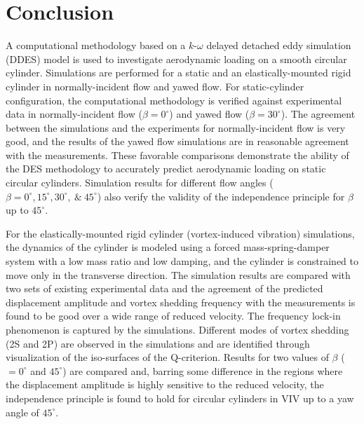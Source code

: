 \documentclass[12pt,authoryear]{elsarticle}
\begin{document}




%



\section{Conclusion}
\label{sec:conclusions}
%
A computational methodology based on a $k$-$\omega$ delayed detached eddy
simulation (DDES) model is used to investigate aerodynamic loading on a smooth
circular cylinder. Simulations are performed for a static and an
elastically-mounted rigid cylinder in normally-incident flow and yawed flow.
For static-cylinder configuration, the computational methodology is verified
against experimental data in normally-incident flow ($\beta=0^\circ$) and yawed
flow ($\beta=30^\circ$). The agreement between the simulations and the
experiments for normally-incident flow is very good, and the results of the
yawed flow simulations are in reasonable agreement with the measurements.
These favorable comparisons demonstrate the ability of the DES methodology to
accurately predict aerodynamic loading on static circular cylinders. Simulation
results for different flow angles ($\beta =0^\circ, 15^\circ,
30^\circ,~\&~45^\circ$) also verify the validity of the independence principle
for $\beta$ up to $45^\circ$.

For the elastically-mounted rigid cylinder (vortex-induced vibration)
simulations, the dynamics of the cylinder is modeled using a forced
mass-spring-damper system with a low mass ratio and low damping, and the
cylinder is constrained to move only in the transverse direction.  The
simulation results are compared with two sets of existing experimental data and
the agreement of the predicted displacement amplitude and vortex shedding
frequency with the measurements is found to be good over a wide range of
reduced velocity. The frequency lock-in phenomenon is captured by the
simulations. Different modes of vortex shedding (2S and 2P) are observed in the
simulations and are identified through visualization of the iso-surfaces of the
Q-criterion. Results for two values of $\beta$ ($=0^\circ$ and $45^\circ$) are
compared and, barring some difference in the regions where the displacement
amplitude is highly sensitive to the reduced velocity, the independence
principle is found to hold for circular cylinders in VIV up to a yaw angle of
$45^\circ$. 
\end{document}
